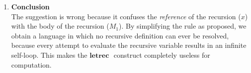 \begin{solution}
\begin{enumerate}
\item \textbf{Conclusion}
\\
The suggestion is wrong because it confuses the \textit{reference} of the recursion ($x$) with the body of the recursion ($M_1$).
By simplifying the rule as proposed, we obtain a language in which no recursive definition can ever be resolved, because every attempt to evaluate the recursive variable results in an infinite self-loop. This makes the $\textbf{letrec } $ construct completely useless for computation.


\end{enumerate}

\end{solution}